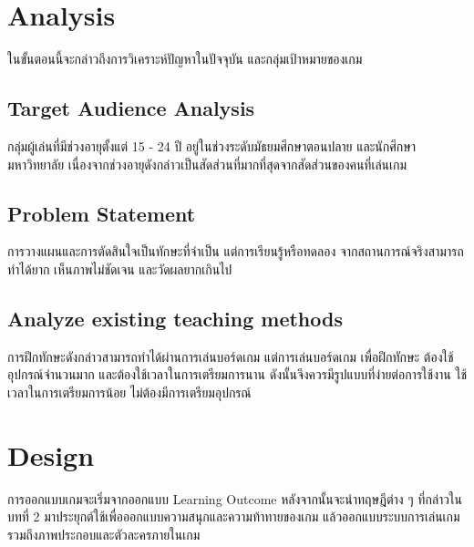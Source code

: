 \documentclass[12pt,oneside,openright,a4paper]{cpe-thai-project}
\begin{document}
\section{Analysis}
ในขั้นตอนนี้จะกล่าวถึงการวิเคราะห์ปัญหาในปัจจุบัน และกลุ่มเป้าหมายของเกม

\subsection{Target Audience Analysis}
กลุ่มผู้เล่นที่มีช่วงอายุตั้งแต่ 15 - 24 ปี อยู่ในช่วงระดับมัธยมศึกษาตอนปลาย
และนักศึกษามหาวิทยาลัย เนื่องจากช่วงอายุดังกล่าวเป็นสัดส่วนที่มากที่สุดจากสัดส่วนของคนที่เล่นเกม 

\subsection{Problem Statement}
การวางแผนและการตัดสินใจเป็นทักษะที่จำเป็น แต่การเรียนรู้หรือทดลอง
จากสถานการณ์จริงสามารถทำได้ยาก เห็นภาพไม่ชัดเจน และวัดผลยากเกินไป

\subsection{Analyze existing teaching methods}
การฝึกทักษะดังกล่าวสามารถทำได้ผ่านการเล่นบอร์ดเกม แต่การเล่นบอร์ดเกม
เพื่อฝึกทักษะ ต้องใช้อุปกรณ์จำนวนมาก และต้องใช้เวลาในการเตรียมการนาน 
ดังนั้นจึงควรมีรูปแบบที่ง่ายต่อการใช้งาน ใช้เวลาในการเตรียมการน้อย 
ไม่ต้องมีการเตรียมอุปกรณ์


\section{Design}
การออกแบบเกมจะเริ่มจากออกแบบ Learning Outcome หลังจากนั้นจะนำทฤษฎีต่าง ๆ 
ที่กล่าวในบทที่ 2 มาประยุกต์ใช้เพื่อออกแบบความสนุกและความท้าทายของเกม 
แล้วออกแบบระบบการเล่นเกมรวมถึงภาพประกอบและตัวละครภายในเกม
\end{document}
